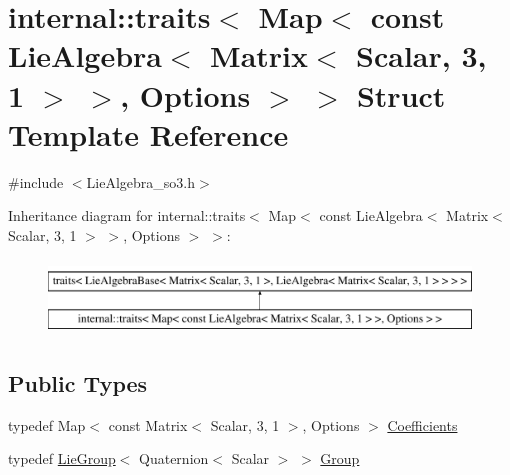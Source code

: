\hypertarget{structinternal_1_1traits_3_01_map_3_01const_01_lie_algebra_3_01_matrix_3_01_scalar_00_013_00_011480673ebb2de2c070cfdb8edee3d7437}{}\section{internal\+:\+:traits$<$ Map$<$ const Lie\+Algebra$<$ Matrix$<$ Scalar, 3, 1 $>$ $>$, Options $>$ $>$ Struct Template Reference}
\label{structinternal_1_1traits_3_01_map_3_01const_01_lie_algebra_3_01_matrix_3_01_scalar_00_013_00_011480673ebb2de2c070cfdb8edee3d7437}


{\ttfamily \#include $<$Lie\+Algebra\+\_\+so3.\+h$>$}

Inheritance diagram for internal\+:\+:traits$<$ Map$<$ const Lie\+Algebra$<$ Matrix$<$ Scalar, 3, 1 $>$ $>$, Options $>$ $>$\+:\begin{figure}[H]
\begin{center}
\leavevmode
\includegraphics[height=2.000000cm]{structinternal_1_1traits_3_01_map_3_01const_01_lie_algebra_3_01_matrix_3_01_scalar_00_013_00_011480673ebb2de2c070cfdb8edee3d7437}
\end{center}
\end{figure}
\subsection*{Public Types}
\begin{DoxyCompactItemize}
\item 
typedef Map$<$ const Matrix$<$ Scalar, 3, 1 $>$, Options $>$ \hyperlink{structinternal_1_1traits_3_01_map_3_01const_01_lie_algebra_3_01_matrix_3_01_scalar_00_013_00_011480673ebb2de2c070cfdb8edee3d7437_abd106fedc67f9610cb2b8ee96ce8aa27}{Coefficients}
\item 
typedef \hyperlink{class_lie_group}{Lie\+Group}$<$ Quaternion$<$ Scalar $>$ $>$ \hyperlink{structinternal_1_1traits_3_01_map_3_01const_01_lie_algebra_3_01_matrix_3_01_scalar_00_013_00_011480673ebb2de2c070cfdb8edee3d7437_acdfb59027e942e113b4f8ad4defe78e0}{Group}
\end{DoxyCompactItemize}



